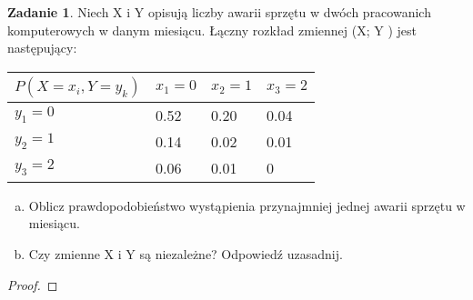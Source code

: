 \documentclass[11pt]{article}
\theoremstyle{definition}
\newtheorem{zadanie}{Zadanie}
\begin{document}
\begin{zadanie} Niech X i Y opisują liczby awarii sprzętu w dwóch pracowanich komputerowych w danym miesiącu. Łączny rozkład
    zmiennej (X; Y ) jest następujący:

    \begin{table}[ht]
        \begin{tabular}{|l|l|l|l|}
            \hline

            $P(X = x_i, Y = y_k)$ & $x_1 = 0$ & $x_2 = 1$ & $x_3 = 2$ \\
            \hline
            $y_1 = 0$             & 0.52      & 0.20      & 0.04      \\
            $y_2 = 1$             & 0.14      & 0.02      & 0.01      \\
            $y_3 = 2$             & 0.06      & 0.01      & 0         \\
            \hline
        \end{tabular}
    \end{table}

    \begin{enumerate}[a)]
        \item Oblicz prawdopodobieństwo wystąpienia przynajmniej jednej awarii sprzętu w miesiącu.
        \item Czy zmienne X i Y są niezależne? Odpowiedź uzasadnij.
    \end{enumerate}
\end{zadanie}
\begin{proof}

\end{proof}
\end{document}
